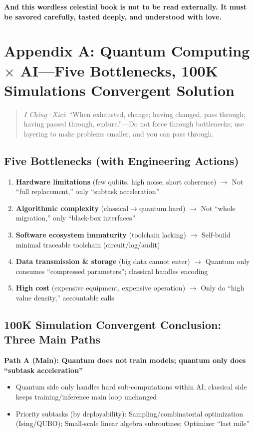 \documentclass[conference]{IEEEtran}
\theoremstyle{remark}
\begin{document}
\textbf{And this wordless celestial book is not to be read externally. It must be savored carefully, tasted deeply, and understood with love.}

\section*{Appendix A: Quantum Computing $\times$ AI---Five Bottlenecks, 100K Simulations Convergent Solution}

\begin{quote}
\emph{I Ching·Xici}: ``When exhausted, change; having changed, pass through; having passed through, endure.''---Do not force through bottlenecks; use layering to make problems smaller, and you can pass through.
\end{quote}

\subsection{Five Bottlenecks (with Engineering Actions)}
\begin{enumerate}[nosep]
\item \textbf{Hardware limitations} (few qubits, high noise, short coherence) $\to$ Not ``full replacement,'' only ``subtask acceleration''
\item \textbf{Algorithmic complexity} (classical$\to$quantum hard) $\to$ Not ``whole migration,'' only ``black-box interfaces''
\item \textbf{Software ecosystem immaturity} (toolchain lacking) $\to$ Self-build minimal traceable toolchain (circuit/log/audit)
\item \textbf{Data transmission \& storage} (big data cannot enter) $\to$ Quantum only consumes ``compressed parameters''; classical handles encoding
\item \textbf{High cost} (expensive equipment, expensive operation) $\to$ Only do ``high value density,'' accountable calls
\end{enumerate}

\subsection{100K Simulation Convergent Conclusion: Three Main Paths}

\textbf{Path A (Main): Quantum does not train models; quantum only does ``subtask acceleration''}
\begin{itemize}[nosep]
\item Quantum side only handles hard sub-computations within AI; classical side keeps training/inference main loop unchanged
\item Priority subtasks (by deployability): Sampling/combinatorial optimization (Ising/QUBO); Small-scale linear algebra subroutines; Optimizer ``last mile''
\end{itemize}
\end{document}
